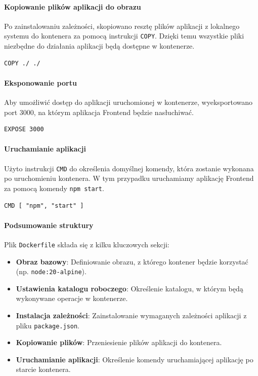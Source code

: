 \paragraph{Kopiowanie plików aplikacji do obrazu}
Po zainstalowaniu zależności, skopiowano resztę plików aplikacji z lokalnego systemu do kontenera za pomocą instrukcji \texttt{COPY}. Dzięki temu wszystkie pliki niezbędne do działania aplikacji będą dostępne w kontenerze.
\begin{lstlisting}[basicstyle=\footnotesize\ttfamily]
COPY ./ ./
\end{lstlisting}

\paragraph{Eksponowanie portu}
Aby umożliwić dostęp do aplikacji uruchomionej w kontenerze, wyeksportowano port 3000, na którym aplikacja Frontend będzie nasłuchiwać.
\begin{lstlisting}[basicstyle=\footnotesize\ttfamily]
EXPOSE 3000
\end{lstlisting}

\paragraph{Uruchamianie aplikacji}
Użyto instrukcji \texttt{CMD} do określenia domyślnej komendy, która zostanie wykonana po uruchomieniu kontenera. W tym przypadku uruchamiamy aplikację Frontend za pomocą komendy \texttt{npm start}.
\begin{lstlisting}[basicstyle=\footnotesize\ttfamily]
CMD [ "npm", "start" ]
\end{lstlisting}

\paragraph{Podsumowanie struktury}
Plik \texttt{Dockerfile} składa się z kilku kluczowych sekcji:
\begin{itemize}
    \item \textbf{Obraz bazowy}: Definiowanie obrazu, z którego kontener będzie korzystać (np. \texttt{node:20-alpine}).
    \item \textbf{Ustawienia katalogu roboczego}: Określenie katalogu, w którym będą wykonywane operacje w kontenerze.
    \item \textbf{Instalacja zależności}: Zainstalowanie wymaganych zależności aplikacji z pliku \texttt{package.json}.
    \item \textbf{Kopiowanie plików}: Przeniesienie plików aplikacji do kontenera.
    \item \textbf{Uruchamianie aplikacji}: Określenie komendy uruchamiającej aplikację po starcie kontenera.
\end{itemize}

